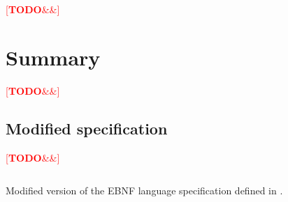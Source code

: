 \documentclass[english,engineering]{wizthesis}
\newcommand{\todo}[1]{%
  \textcolor{red}{[\textbf{TODO}\ifx&#1&{}\else{ }\fi\emph{#1}]}%
}
\begin{document}
\todo{}

\chapter{Summary}

\todo{}



\listoffigures

\listoftables

\listoflistings

\begin{appendices}

\chapter{Modified specification} \label{ch:modified-spec}

\todo{}

\begin{listing}[H]
  \inputminted[fontsize=\small,frame=lines,breaklines,linenos]
    {lexers/ebnf_lexer.py:EbnfLexer -x}{listings/specification.ebnf}
  \caption{Modified version of the EBNF language specification defined in
  \cite{iso-14977}.}
  \label{lst:specification}
\end{listing}

\end{appendices}
\end{document}
